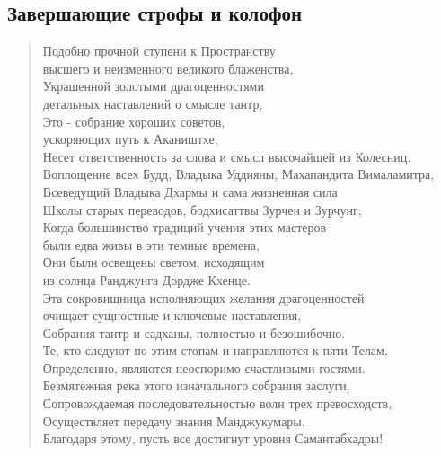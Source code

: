 \subsection*{Завершающие строфы и колофон}

\begin{verse}
Подобно прочной ступени к Пространству \\
высшего и неизменного великого блаженства,\\
Украшенной золотыми драгоценностями \\
детальных наставлений о смысле тантр,\\
Это - собрание хороших советов, \\
ускоряющих путь к Акаништхе,\\
Несет ответственность за слова и смысл высочайшей из Колесниц.
Воплощение всех Будд, Владыка Уддияны, Махапандита Вималамитра,
Всеведущий Владыка Дхармы и сама жизненная сила \\
Школы старых переводов, бодхисаттвы Зурчен и Зурчунг;\\
Когда большинство традиций учения этих мастеров \\
были едва живы в эти темные времена,\\
Они были освещены светом, исходящим \\
из солнца Ранджунга Дордже Кхенце.\\
Эта сокровищница исполняющих желания драгоценностей \\
очищает сущностные и ключевые наставления,\\
Собрания тантр и садханы, полностью и безошибочно.\\
Те, кто следуют по этим стопам и направляются к пяти Телам,\\
Определенно, являются неоспоримо счастливыми гостями.\\
Безмятежная река этого изначального собрания заслуги,\\
Сопровождаемая последовательностью волн трех превосходств,\\
Осуществляет передачу знания Манджукумары.\\
Благодаря этому, пусть все достигнут уровня Самантабхадры!
\end{verse}

